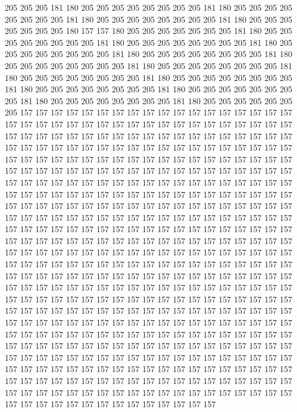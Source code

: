 205 205 205 181 180 205 205 205 205 205 205 205 205 181 180 205 205 205 205 205
205 205 205 181 180 205 205 205 205 205 205 205 205 181 180 205 205 205 205 205
205 205 180 157 157 180 205 205 205 205 205 205 205 181 180 205 205 205 205 205
205 205 205 181 180 205 205 205 205 205 205 205 205 181 180 205 205 205 205 205
205 205 205 181 180 205 205 205 205 205 205 205 205 181 180 205 205 205 205 205
205 205 205 181 180 205 205 205 205 205 205 205 205 181 180 205 205 205 205 205
205 205 205 181 180 205 205 205 205 205 205 205 205 181 180 205 205 205 205 205
205 205 205 181 180 205 205 205 205 205 205 205 205 181 180 205 205 205 205 205
205 205 205 181 180 205 205 205 205 205 205 205 157 157 157 157 157 157 157 157
157 157 157 157 157 157 157 157 157 157 157 157 157 157 157 157 157 157 157 157
157 157 157 157 157 157 157 157 157 157 157 157 157 157 157 157 157 157 157 157
157 157 157 157 157 157 157 157 157 157 157 157 157 157 157 157 157 157 157 157
157 157 157 157 157 157 157 157 157 157 157 157 157 157 157 157 157 157 157 157
157 157 157 157 157 157 157 157 157 157 157 157 157 157 157 157 157 157 157 157
157 157 157 157 157 157 157 157 157 157 157 157 157 157 157 157 157 157 157 157
157 157 157 157 157 157 157 157 157 157 157 157 157 157 157 157 157 157 157 157
157 157 157 157 157 157 157 157 157 157 157 157 157 157 157 157 157 157 157 157
157 157 157 157 157 157 157 157 157 157 157 157 157 157 157 157 157 157 157 157
157 157 157 157 157 157 157 157 157 157 157 157 157 157 157 157 157 157 157 157
157 157 157 157 157 157 157 157 157 157 157 157 157 157 157 157 157 157 157 157
157 157 157 157 157 157 157 157 157 157 157 157 157 157 157 157 157 157 157 157
157 157 157 157 157 157 157 157 157 157 157 157 157 157 157 157 157 157 157 157
157 157 157 157 157 157 157 157 157 157 157 157 157 157 157 157 157 157 157 157
157 157 157 157 157 157 157 157 157 157 157 157 157 157 157 157 157 157 157 157
157 157 157 157 157 157 157 157 157 157 157 157 157 157 157 157 157 157 157 157
157 157 157 157 157 157 157 157 157 157 157 157 157 157 157 157 157 157 157 157
157 157 157 157 157 157 157 157 157 157 157 157 157 157 157 157 157 157 157 157
157 157 157 157 157 157 157 157 157 157 157 157 157 157 157 157 157 157 157 157
157 157 157 157 157 157 157 157 157 157 157 157 157 157 157 157 157 157 157 157
157 157 157 157 157 157 157 157 157 157 157 157 157 157 157 157 157 157 157 157
157 157 157 157 157 157 157 157 157 157 157 157 157 157 157 157 157 157 157 157
157 157 157 157 157 157 157 157 157 157 157 157 157 157 157 157 157 157 157 157
157 157 157 157 157 157 157 157 157 157 157 157 157 157 157 157 157 157 157 157
